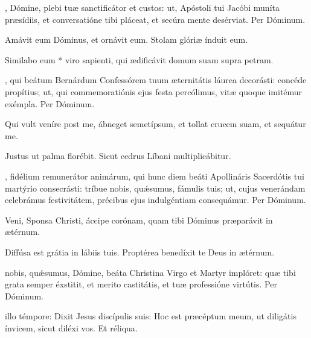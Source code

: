 \documentclass[fontsize=9pt,paper=A6,twoside,BCOR=1mm,DIV=22,headinclude]{scrarticle}
\renewcommand\A{\Ant}
\begin{document}
\begin{multicols}{2}
{
, Dómine, plebi tuæ sanctificátor et custos: ut, Apóstoli tui Jacóbi muníta præsídiis, et conversatióne tibi pláceat, et secúra mente desérviat. Per Dóminum.

}




\V Amávit eum Dóminus, et ornávit eum.
\R Stolam glóriæ índuit eum.

 Similabo eum * viro sapienti, qui ædificávit domum suam supra petram.

, qui beátum Bernárdum Confessórem tuum æternitátis láurea decorásti: concéde propítius; ut, qui commemoratiónis ejus festa percólimus, vitæ quoque imitémur exémpla. Per Dóminum.


\A Qui vult veníre post me, ábneget semetípsum, et tollat crucem suam, et sequátur me.

\V Justus ut palma florébit.
\R Sicut cedrus Líbani multiplicábitur.

, fidélium remunerátor animárum, qui hunc diem beáti Apollináris Sacerdótis tui martýrio consecrásti: tríbue nobis, quǽsumus, fámulis tuis; ut, cujus venerándam celebrámus festivitátem, précibus ejus indulgéntiam consequámur. Per Dóminum.


\A Veni, Sponsa Christi, áccipe corónam, quam tibi Dóminus præparávit in ætérnum.

\V Diffúsa est grátia in lábiis tuis.
\R Proptérea benedíxit te Deus in ætérnum.

 nobis, quǽsumus, Dómine, beáta Christina Virgo et Martyr implóret: quæ tibi grata semper éxstitit, et merito castitátis, et tuæ professióne virtútis. Per Dóminum.



 illo témpore: Dixit Jesus discípulis suis: Hoc est præcéptum meum, ut diligátis ínvicem, sicut diléxi vos. Et réliqua.


\end{multicols}
\end{document}
